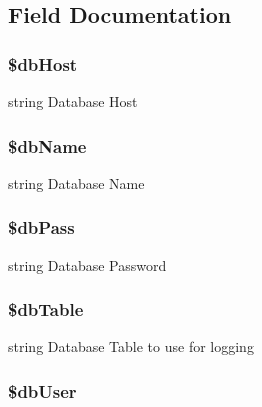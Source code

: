 \subsection{Field Documentation}
\hypertarget{class_debug_ad0ddb2725e69c88a729e0cc242a1b2a6}{
\subsubsection[{\$db\-Host}]{\setlength{\rightskip}{0pt plus 5cm}\$db\-Host\hspace{0.3cm}{\ttfamily [static]}}}\label{class_debug_ad0ddb2725e69c88a729e0cc242a1b2a6}
string Database Host \hypertarget{class_debug_a68f39949e76b64662a06cb56579d91c3}{
\subsubsection[{\$db\-Name}]{\setlength{\rightskip}{0pt plus 5cm}\$db\-Name\hspace{0.3cm}{\ttfamily [static]}}}\label{class_debug_a68f39949e76b64662a06cb56579d91c3}
string Database Name \hypertarget{class_debug_a30d808caf55f524798c6a5aaafd633ad}{
\subsubsection[{\$db\-Pass}]{\setlength{\rightskip}{0pt plus 5cm}\$db\-Pass\hspace{0.3cm}{\ttfamily [static]}}}\label{class_debug_a30d808caf55f524798c6a5aaafd633ad}
string Database Password \hypertarget{class_debug_adfd23e5286c56c7632ecb55887dd2555}{
\subsubsection[{\$db\-Table}]{\setlength{\rightskip}{0pt plus 5cm}\$db\-Table\hspace{0.3cm}{\ttfamily [static]}}}\label{class_debug_adfd23e5286c56c7632ecb55887dd2555}
string Database Table to use for logging \hypertarget{class_debug_a4a92606de85aafdc0dcae4976b7ca669}{
\subsubsection[{\$db\-User}]{\setlength{\rightskip}{0pt plus 5cm}\$db\-User\hspace{0.3cm}{\ttfamily [static]}}}\label{class_debug_a4a92606de85aafdc0dcae4976b7ca669}
